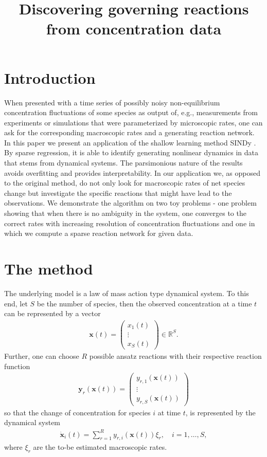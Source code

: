 \documentclass[oneside, abstracton, titlepage]{scrartcl}
\begin{document}
	\title{Discovering governing reactions from concentration data}
	\maketitle

	\section{Introduction}
	When presented with a time series of possibly noisy non-equilibrium concentration fluctuations of some species as output of, e.g., measurements from experiments or simulations that were parameterized by microscopic rates, one can ask for the corresponding macroscopic rates and a generating reaction network.
	In this paper we present an application of the shallow learning method SINDy \cite{Brunton2015}. By sparse regression, it is able to identify generating nonlinear dynamics in data that stems from dynamical systems. The parsimonious nature of the results avoids overfitting and provides interpretability.
	In our application we, as opposed to the original method, do not only look for macroscopic rates of net species change but investigate the specific reactions that might have lead to the observations.
	We demonstrate the algorithm on two toy problems - one problem showing that when there is no ambiguity in the system, one converges to the correct rates with increasing resolution of concentration fluctuations and one in which we compute a sparse reaction network for given data.

	\section{The method}
	The underlying model is a law of mass action type dynamical system. To this end, let $S$ be the number of species, then the observed concentration at a time $t$ can be represented by a vector
	\begin{align}
	\mathbf{x}(t)=\begin{pmatrix}
	x_1(t)\\ \vdots \\ x_S(t)
	\end{pmatrix}\in \mathbb{R}^S.
	\end{align}
	Further, one can choose $R$ possible ansatz reactions with their respective reaction function
	\begin{align}
	\textbf{y}_r(\textbf{x}(t))=\begin{pmatrix}
	y_{r,1}(\textbf{x}(t)) \\ \vdots \\ y_{r,S}(\textbf{x}(t))
	\end{pmatrix}
	\end{align}
	so that the change of concentration for species $i$ at time $t$, is represented by the dynamical system
	\begin{align}
	\dot{\textbf{x}}_i(t) = \sum_{r=1}^{R}y_{r,i}(\textbf{x}(t))\xi_r,\quad i=1,\ldots, S,
	\label{method:the-system}\end{align}
	where $\xi_r$ are the to-be estimated macroscopic rates.
\end{document}
